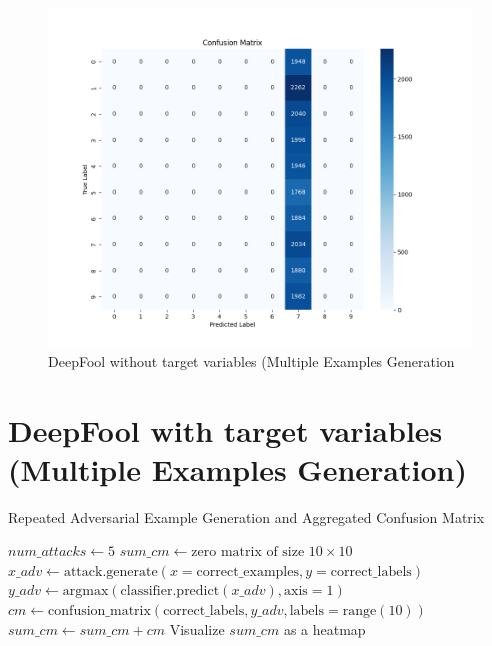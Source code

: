 \documentclass[11pt,onside]{article}
\begin{document}
\begin{figure}[h]
\centering
\includegraphics[width=1\textwidth]{V1_images/Mul_DeepFool_withOUT_target.png}
\caption{DeepFool without target variables (Multiple Examples Generation}
\label{fig: DeepFool without target variables (Multiple Examples Generation)}
\end{figure}


\section{DeepFool with target variables (Multiple Examples Generation)}

\begin{algorithm}[H]
\caption{Repeated Adversarial Example Generation and Aggregated Confusion Matrix}
\begin{algorithmic}[1]
\State $num\_attacks \gets 5$
\State $sum\_cm \gets \text{zero matrix of size } 10 \times 10$
    \State $x\_adv \gets \text{attack.generate}(x=\text{correct\_examples},y=\text{correct\_labels})$
    \State $y\_adv \gets \text{argmax}(\text{classifier.predict}(x\_adv), \text{axis}=1)$
    \State $cm \gets \text{confusion\_matrix}(\text{correct\_labels}, y\_adv, \text{labels}=\text{range}(10))$
    \State $sum\_cm \gets sum\_cm + cm$
\EndFor
\State Visualize $sum\_cm$ as a heatmap
\end{algorithmic}
\end{algorithm}
\end{document}
